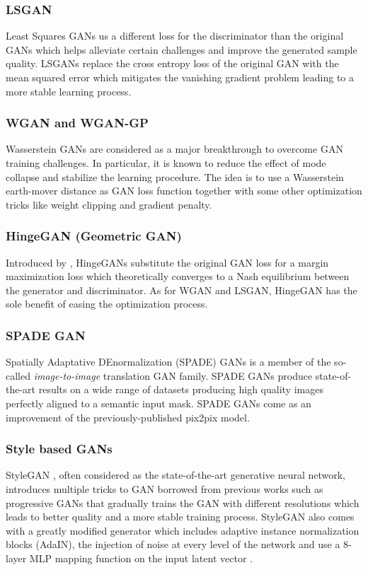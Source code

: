 \documentclass[preprint,12pt, authoryear]{elsarticle}
\begin{document}
\subsubsection{LSGAN} Least Squares GANs \citep{Mao2017LeastSG} us a different loss for the discriminator than the original GANs which helps alleviate certain challenges and improve the generated sample quality. LSGANs replace the cross entropy loss of the original GAN with the mean squared error which mitigates the vanishing gradient problem leading to a more stable learning process.
\subsubsection{WGAN and WGAN-GP} Wasserstein GANs \citep{pmlr-v70-arjovsky17a} are considered as a major breakthrough to overcome GAN training challenges.  In particular, it is known to reduce the effect of mode collapse and stabilize the learning procedure.  The idea is to use a  Wasserstein earth-mover distance as GAN loss function together with some other optimization tricks like weight clipping and gradient penalty.
\subsubsection{HingeGAN (Geometric GAN)} Introduced by \cite{Lim2017GeometricG}, HingeGANs substitute the original GAN loss for a margin maximization loss which theoretically converges to a Nash equilibrium between the generator and discriminator.  As for WGAN and LSGAN, HingeGAN has the sole benefit of easing the optimization process.
\subsubsection{SPADE GAN} Spatially Adaptative DEnormalization (SPADE) GANs \citep{Park2019SemanticIS} is a member of the so-called {\em image-to-image} translation GAN family.  SPADE GANs produce state-of-the-art  results on a wide range of datasets producing high quality images perfectly aligned to a semantic input mask. SPADE GANs come as an improvement of the previously-published pix2pix \citep{Isola2017ImagetoImageTW} model. 
\subsubsection{Style based GANs} StyleGAN \citep{Karras2020AnalyzingAI}, often considered as the state-of-the-art generative neural network, introduces multiple tricks to GAN borrowed from previous works such as progressive GANs \citep{karras2018progressive} that gradually trains the GAN with different resolutions which leads to better quality and a more stable training process. StyleGAN also comes with a greatly modified generator which includes adaptive instance normalization blocks (AdaIN), the injection of noise at every level of the network and use a 8-layer MLP mapping function on the input latent vector .
\end{document}
